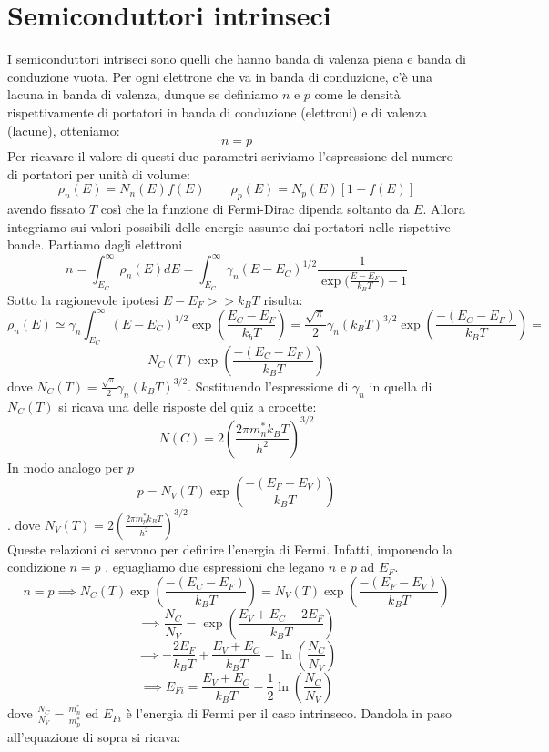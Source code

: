 \documentclass{book}
\begin{document}
    \section{Semiconduttori intrinseci}
        I semiconduttori intriseci sono quelli che hanno banda di valenza piena e banda di conduzione vuota. Per ogni elettrone che va in banda di conduzione, c'è una lacuna in banda di valenza, dunque se definiamo $n$ e $p$ come le densità rispettivamente di portatori in banda di conduzione (elettroni) e di valenza (lacune), otteniamo:
        $$n = p$$
        Per ricavare il valore di questi due parametri scriviamo l'espressione del numero di portatori per unità di volume:
        $$\rho_{n}(E) = N_{n}(E)f(E) \qquad \rho_{p}(E) = N_{p}(E)[1-f(E)]$$
        avendo fissato $T$ così che la funzione di Fermi-Dirac dipenda soltanto da $E$. Allora integriamo sui valori possibili delle energie assunte dai portatori nelle rispettive bande. Partiamo dagli elettroni
        $$n = \int_{E_{C}} ^{\infty} \rho_{n}(E)dE = \int_{E_{C}} ^{\infty} \gamma_{n}(E-E_{C})^{1/2}\frac{1}{\exp{(\frac{E-E_{F}}{k_{B}T}})-1}$$
        Sotto la ragionevole ipotesi $E-E_{F} >> k_{B}T$ risulta:
        $$\rho_{n}(E) \simeq    \gamma_{n} \int_{E_{C}} ^{\infty} (E-E_{C})^{1/2}\exp{(\frac{E_{C}-E_{F}}{k_{b}T})} = \frac{\sqrt{\pi}}{2} \gamma_{n}(k_{B}T)^{3/2}\exp{(\frac{-(E_{C}-E_{F})}{k_{B}T})} = 
        $$
        $$N_{C}(T)\exp{(\frac{-(E_{C}-E_{F})}{k_{B}T})}$$
        dove $N_{C}(T)=\frac{\sqrt{\pi}}{2} \gamma_{n}(k_{B}T)^{3/2}$.
        Sostituendo l'espressione di $\gamma_{n}$ in quella di $N_{C}(T)$ si ricava una delle risposte del quiz a crocette:
        $$N(C) = \displaystyle 2(\frac{2 \pi m_{n} ^{*}k_{B}T}{h^{2}})^{3/2}$$
        In modo analogo per $p$
        $$p = N_{V}(T)\exp{(\frac{-(E_{F}-E_{V})}{k_{B}T})}$$.
        dove $N_{V}(T) = \displaystyle 2(\frac{2 \pi m_{p} ^{*}k_{B}T}{h^{2}})^{3/2} $\\
        Queste relazioni ci servono per definire l'energia di Fermi. Infatti, imponendo la condizione $n=p$ , eguagliamo due espressioni che legano $n$ e $p$ ad $E_{F}$.
        $$n = p \implies N_{C}(T)\exp{(\frac{-(E_{C}-E_{F})}{k_{B}T})} = N_{V}(T)\exp{(\frac{-(E_{F}-E_{V})}{k_{B}T})}$$
        $$\implies \frac{N_{C}}{N_{V}} = \exp{(\frac{E_{V}+E_{C}-2E_{F}}{k_{B}T})}$$
        $$\implies -\frac{2E_{F}}{k_{B}T} + \frac{E_{V}+E_{C}}{k_{B}T} = \ln{(\frac{N_{C}}{N_{V}})} $$
        $$\implies E_{Fi} = \frac{E_{V}+E_{C}}{k_{B}T}-\frac{1}{2}\ln{(\frac{N_{C}}{N_{V}})}$$
        dove $\displaystyle \frac{N_{C}}{N_{V}} = \frac{m_{n} ^{*}}{m_{p} ^{*}}$ ed $E_{Fi}$ è l'energia di Fermi per il caso intrinseco. Dandola in paso all'equazione di sopra si ricava:
\end{document}
